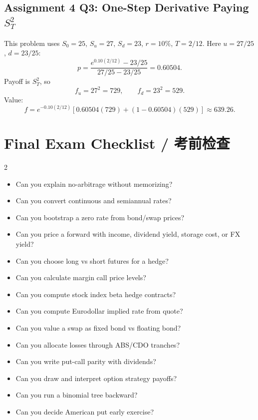 \documentclass[11pt,a4paper,openany]{ctexbook}
\begin{document}
\section{\texorpdfstring{Assignment 4 Q3: One-Step Derivative Paying $S_T^2$}{Assignment 4 Q3: One-Step Derivative Paying ST squared}}
This problem uses $S_0=25$, $S_u=27$, $S_d=23$, $r=10\%$, $T=2/12$. Here $u=27/25$, $d=23/25$:
\[
p=\frac{e^{0.10(2/12)}-23/25}{27/25-23/25}=0.60504.
\]
Payoff is $S_T^2$, so
\[
f_u=27^2=729,\qquad f_d=23^2=529.
\]
Value:
\[
f=e^{-0.10(2/12)}\left[0.60504(729)+(1-0.60504)(529)\right]\approx639.26.
\]

\backmatter
\chapter*{Final Exam Checklist / 考前检查}
\begin{multicols}{2}
\begin{itemize}
  \item Can you explain no-arbitrage without memorizing?
  \item Can you convert continuous and semiannual rates?
  \item Can you bootstrap a zero rate from bond/swap prices?
  \item Can you price a forward with income, dividend yield, storage cost, or FX yield?
  \item Can you choose long vs short futures for a hedge?
  \item Can you calculate margin call price levels?
  \item Can you compute stock index beta hedge contracts?
  \item Can you compute Eurodollar implied rate from quote?
  \item Can you value a swap as fixed bond vs floating bond?
  \item Can you allocate losses through ABS/CDO tranches?
  \item Can you write put-call parity with dividends?
  \item Can you draw and interpret option strategy payoffs?
  \item Can you run a binomial tree backward?
  \item Can you decide American put early exercise?
\end{itemize}
\end{multicols}
\end{document}

